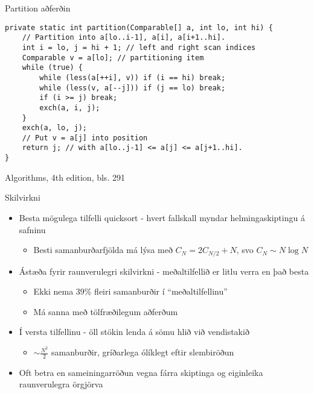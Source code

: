\documentclass[handout]{beamer}
\begin{document}
\begin{frame}[fragile]{Partition aðferðin}
	\vspace{0.5cm}
	\begin{verbatim}
private static int partition(Comparable[] a, int lo, int hi) { 
    // Partition into a[lo..i-1], a[i], a[i+1..hi].
    int i = lo, j = hi + 1; // left and right scan indices
    Comparable v = a[lo]; // partitioning item
    while (true) {
        while (less(a[++i], v)) if (i == hi) break;
        while (less(v, a[--j])) if (j == lo) break;
        if (i >= j) break;
        exch(a, i, j);
    }
    exch(a, lo, j);
    // Put v = a[j] into position
    return j; // with a[lo..j-1] <= a[j] <= a[j+1..hi].
}
    \end{verbatim}
	\begin{center}
		Algorithms, 4th edition, bls. 291
	\end{center}
\end{frame}

\headandfoot

\begin{frame}{Skilvirkni}
	\begin{itemize}
		\item Besta mögulega tilfelli quicksort - hvert fallskall myndar helmingaskiptingu á safninu
		      \begin{itemize}
			      \item Besti samanburðarfjölda má lýsa með $C_N = 2C_{N/2} + N$, svo $C_N \sim N \log N$
		      \end{itemize}
		\item Ástæða fyrir raunverulegri skilvirkni - meðaltilfellið er litlu verra en það besta
		      \begin{itemize}
			      \item Ekki nema 39\% fleiri samanburðir í ``meðaltilfellinu''
			      \item Má sanna með tölfræðilegum aðferðum
		      \end{itemize}
		\item Í versta tilfellinu - öll stökin lenda á sömu hlið við vendistakið
		      \begin{itemize}
			      \item $\sim \frac{N^2}{2}$ samanburðir, gríðarlega ólíklegt eftir slembiröðun
		      \end{itemize}
		\item Oft betra en sameiningarröðun vegna fárra skiptinga og eiginleika raunverulegra örgjörva
	\end{itemize}
\end{frame}
\end{document}
